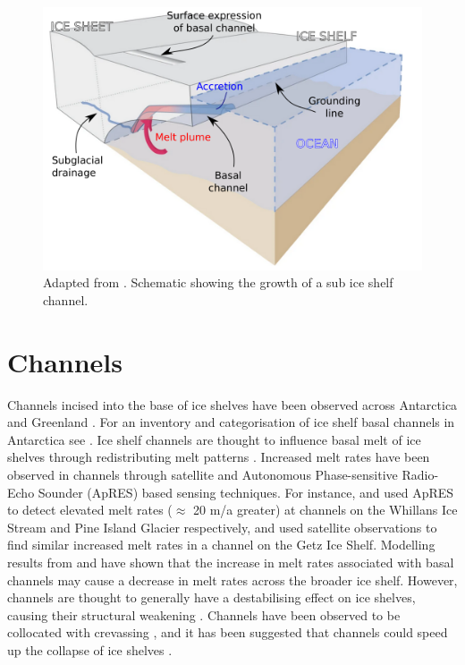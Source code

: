 \begin{figure}[!ht]
\centering
\includegraphics[width=1\textwidth]{chapters/1/chennel_schematic.png}
\caption[Channel Schematic]{Adapted from \cite{le2013evidence}.  Schematic showing the growth of a sub ice shelf channel.}
\label{fig:channel_schematic}
\end{figure}  
\section{Channels} \label{sec:channels}

Channels incised into the base of ice shelves have been observed across Antarctica and Greenland \citep[e.g.][]{alley2016impacts,washam2019summer}. For an inventory and categorisation of ice shelf basal channels in Antarctica see \cite{alley2016impacts}.
Ice shelf channels are thought to influence basal melt of ice shelves through redistributing melt patterns \citep{millgate2013effect}. 
Increased melt rates have been observed in channels through satellite and Autonomous Phase-sensitive Radio-Echo Sounder (ApRES) based sensing techniques. For instance, \cite{marsh2016high} and \cite{stanton2013channelized} used ApRES to detect elevated melt rates ($\approx$ 20 m/a greater) at channels on the Whillans Ice Stream and Pine Island Glacier respectively, and \cite{chartrand2020basal}  used satellite observations to find similar increased melt rates in a channel on the Getz Ice Shelf.
Modelling results from \cite{gladish2012ice} and \cite{millgate2013effect} have shown that the increase in melt rates associated with basal channels may cause a decrease in melt rates across the broader ice shelf.
However, channels are thought to generally have a destabilising effect on ice shelves, causing their structural weakening \citep{alley2019troughs}. Channels have been observed to be collocated with crevassing \citep{stanton2013channelized,alley2016impacts}, and it has been suggested that channels could speed up the collapse of ice shelves \cite{rignot2008channelized}. 

